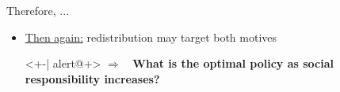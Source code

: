 \documentclass[11pt,aspectratio=169]{beamer}
\newcommand{\ar}{$\Rightarrow$ \ }
\begin{document}
\begin{frame}{Therefore, ...}
\begin{itemize}
\begin{itemize}
			\end{itemize}
			\vspace{2mm}
			
			
			\item<+-> \underline{Then again:} redistribution may target both motives
			\vspace{2mm}
			\item[]<+-| alert@+> 
			\textcolor{myorange}{\textbf{\ar What is the optimal policy as social responsibility increases?}}
		\end{itemize}
	\hypertarget{backmov}{}
	\end{frame}
\end{document}
